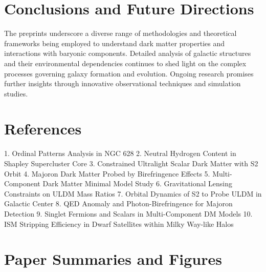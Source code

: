 \documentclass[11pt]{article}
\begin{document}
\section*{Conclusions and Future Directions}
The preprints underscore a diverse range of methodologies and theoretical frameworks being employed to understand dark matter properties and interactions with baryonic components. Detailed analysis of galactic structures and their environmental dependencies continues to shed light on the complex processes governing galaxy formation and evolution. Ongoing research promises further insights through innovative observational techniques and simulation studies.
\section*{References}
1. Ordinal Patterns Analysis in NGC 628
2. Neutral Hydrogen Content in Shapley Supercluster Core
3. Constrained Ultralight Scalar Dark Matter with S2 Orbit
4. Majoron Dark Matter Probed by Birefringence Effects
5. Multi-Component Dark Matter Minimal Model Study
6. Gravitational Lensing Constraints on ULDM Mass Ratios
7. Orbital Dynamics of S2 to Probe ULDM in Galactic Center
8. QED Anomaly and Photon-Birefringence for Majoron Detection
9. Singlet Fermions and Scalars in Multi-Component DM Models
10. ISM Stripping Efficiency in Dwarf Satellites within Milky Way-like Halos
\newpage
\section*{Paper Summaries and Figures}
\end{document}
